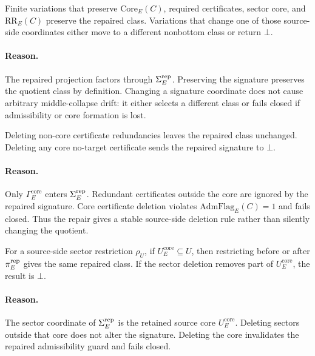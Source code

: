 \begin{proposition}
Finite variations that preserve \(\mathrm{Core}_E(C)\), required certificates,
sector core, and \(\mathrm{RR}_E(C)\) preserve the repaired class. Variations
that change one of those source-side coordinates either move to a different
nonbottom class or return \(\bot\).
\end{proposition}

\paragraph{Reason.}
The repaired projection factors through \(\Sigma^{\mathrm{rep}}_E\). Preserving the signature
preserves the quotient class by definition. Changing a signature coordinate
does not cause arbitrary middle-collapse drift: it either selects a different
class or fails closed if admissibility or core formation is lost.

\begin{proposition}
Deleting non-core certificate redundancies leaves the repaired class
unchanged. Deleting any core no-target certificate sends the repaired
signature to \(\bot\).
\end{proposition}

\paragraph{Reason.}
Only \(\Gamma_E^{\mathrm{core}}\) enters \(\Sigma^{\mathrm{rep}}_E\). Redundant certificates
outside the core are ignored by the repaired signature. Core certificate
deletion violates \(\mathrm{AdmFlag}_E(C)=1\) and fails closed. Thus the
repair gives a stable source-side deletion rule rather than silently changing
the quotient.

\begin{proposition}
For a source-side sector restriction \(\rho_U\), if
\(U_E^{\mathrm{core}}\subseteq U\), then restricting before or after
\(\pi^{\mathrm{rep}}_E\) gives the same repaired class. If the sector deletion removes
part of \(U_E^{\mathrm{core}}\), the result is \(\bot\).
\end{proposition}

\paragraph{Reason.}
The sector coordinate of \(\Sigma^{\mathrm{rep}}_E\) is the retained source core
\(U_E^{\mathrm{core}}\). Deleting sectors outside that core does not alter the
signature. Deleting the core invalidates the repaired admissibility guard and
fails closed.

